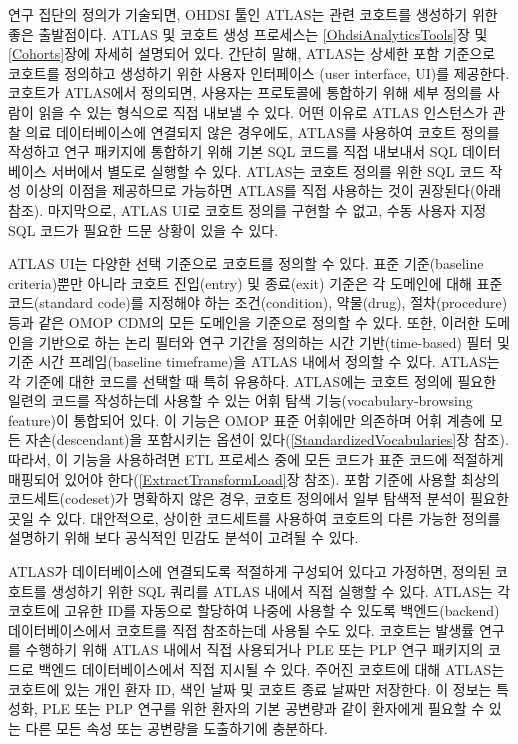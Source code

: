 \documentclass[11pt]{book}
\theoremstyle{definition}
\theoremstyle{definition}
\theoremstyle{definition}
\theoremstyle{remark}
\begin{document}
연구 집단의 정의가 기술되면, OHDSI 툴인 ATLAS는 관련 코호트를 생성하기
위한 좋은 출발점이다. ATLAS 및 코호트 생성 프로세스는
\ref{OhdsiAnalyticsTools}장 및 \ref{Cohorts}장에 자세히 설명되어 있다.
간단히 말해, ATLAS는 상세한 포함 기준으로 코호트를 정의하고 생성하기
위한 사용자 인터페이스 (user interface, UI)를 제공한다. 코호트가
ATLAS에서 정의되면, 사용자는 프로토콜에 통합하기 위해 세부 정의를 사람이
읽을 수 있는 형식으로 직접 내보낼 수 있다. 어떤 이유로 ATLAS 인스턴스가
관찰 의료 데이터베이스에 연결되지 않은 경우에도, ATLAS를 사용하여 코호트
정의를 작성하고 연구 패키지에 통합하기 위해 기본 SQL 코드를 직접
내보내서 SQL 데이터베이스 서버에서 별도로 실행할 수 있다. ATLAS는 코호트
정의를 위한 SQL 코드 작성 이상의 이점을 제공하므로 가능하면 ATLAS를 직접
사용하는 것이 권장된다(아래 참조). 마지막으로, ATLAS UI로 코호트 정의를
구현할 수 없고, 수동 사용자 지정 SQL 코드가 필요한 드문 상황이 있을 수
있다.

ATLAS UI는 다양한 선택 기준으로 코호트를 정의할 수 있다. 표준
기준(baseline criteria)뿐만 아니라 코호트 진입(entry) 및 종료(exit)
기준은 각 도메인에 대해 표준 코드(standard code)를 지정해야 하는
조건(condition), 약물(drug), 절차(procedure) 등과 같은 OMOP CDM의 모든
도메인을 기준으로 정의할 수 있다. 또한, 이러한 도메인을 기반으로 하는
논리 필터와 연구 기간을 정의하는 시간 기반(time-based) 필터 및 기준 시간
프레임(baseline timeframe)을 ATLAS 내에서 정의할 수 있다. ATLAS는 각
기준에 대한 코드를 선택할 때 특히 유용하다. ATLAS에는 코호트 정의에
필요한 일련의 코드를 작성하는데 사용할 수 있는 어휘 탐색
기능(vocabulary-browsing feature)이 통합되어 있다. 이 기능은 OMOP 표준
어휘에만 의존하며 어휘 계층에 모든 자손(descendant)을 포함시키는 옵션이
있다(\ref{StandardizedVocabularies}장 참조). 따라서, 이 기능을
사용하려면 ETL 프로세스 중에 모든 코드가 표준 코드에 적절하게 매핑되어
있어야 한다(\ref{ExtractTransformLoad}장 참조). 포함 기준에 사용할
최상의 코드세트(codeset)가 명확하지 않은 경우, 코호트 정의에서 일부
탐색적 분석이 필요한 곳일 수 있다. 대안적으로, 상이한 코드세트를
사용하여 코호트의 다른 가능한 정의를 설명하기 위해 보다 공식적인 민감도
분석이 고려될 수 있다.

ATLAS가 데이터베이스에 연결되도록 적절하게 구성되어 있다고 가정하면,
정의된 코호트를 생성하기 위한 SQL 쿼리를 ATLAS 내에서 직접 실행할 수
있다. ATLAS는 각 코호트에 고유한 ID를 자동으로 할당하여 나중에 사용할 수
있도록 백엔드(backend) 데이터베이스에서 코호트를 직접 참조하는데 사용될
수도 있다. 코호트는 발생률 연구를 수행하기 위해 ATLAS 내에서 직접
사용되거나 PLE 또는 PLP 연구 패키지의 코드로 백엔드 데이터베이스에서
직접 지시될 수 있다. 주어진 코호트에 대해 ATLAS는 코호트에 있는 개인
환자 ID, 색인 날짜 및 코호트 종료 날짜만 저장한다. 이 정보는 특성화, PLE
또는 PLP 연구를 위한 환자의 기본 공변량과 같이 환자에게 필요할 수 있는
다른 모든 속성 또는 공변량을 도출하기에 충분하다.
\end{document}
